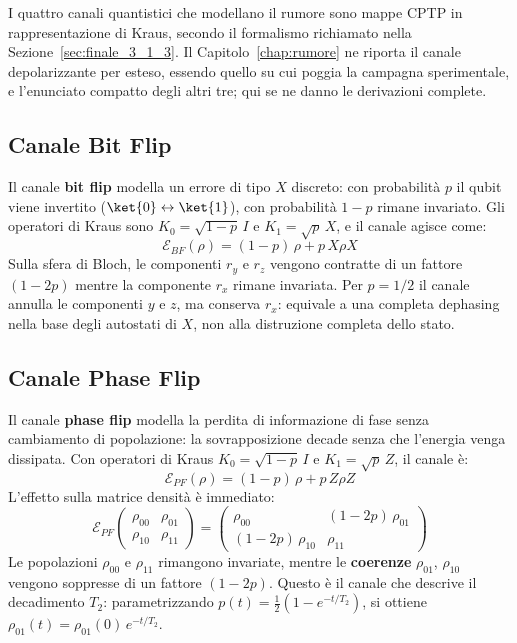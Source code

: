 
I quattro canali quantistici che modellano il rumore sono mappe \ac{CPTP} in
rappresentazione di Kraus, secondo il formalismo richiamato nella
Sezione~\ref{sec:finale_3_1_3}. Il Capitolo~\ref{chap:rumore} ne riporta il
canale depolarizzante per esteso, essendo quello su cui poggia la campagna
sperimentale, e l'enunciato compatto degli altri tre; qui se ne danno le
derivazioni complete.

\subsection{Canale Bit Flip}

Il canale \textbf{bit flip} modella un errore di tipo $X$ discreto: con probabilità $p$ il qubit viene invertito ($\ket{0}\leftrightarrow\ket{1}$), con probabilità $1-p$ rimane invariato. Gli operatori di Kraus sono $K_0 = \sqrt{1-p}\,I$ e $K_1 = \sqrt{p}\,X$, e il canale agisce come:
\begin{equation}
    \mathcal{E}_{BF}(\rho) = (1-p)\,\rho + p\,X\rho X
    \label{eq:bitflip}
\end{equation}
Sulla sfera di Bloch, le componenti $r_y$ e $r_z$ vengono contratte di un fattore $(1-2p)$ mentre la componente $r_x$ rimane invariata. Per $p=1/2$ il canale annulla le componenti $y$ e $z$, ma conserva $r_x$: equivale a una completa dephasing nella base degli autostati di $X$, non alla distruzione completa dello stato.

\subsection{Canale Phase Flip}

Il canale \textbf{phase flip} modella la perdita di informazione di fase senza cambiamento di popolazione: la sovrapposizione decade senza che l'energia venga dissipata. Con operatori di Kraus $K_0 = \sqrt{1-p}\,I$ e $K_1 = \sqrt{p}\,Z$, il canale è:
\begin{equation}
    \mathcal{E}_{PF}(\rho) = (1-p)\,\rho + p\,Z\rho Z
    \label{eq:phaseflip}
\end{equation}
L'effetto sulla matrice densità è immediato:
\begin{equation}
    \mathcal{E}_{PF}\!\begin{pmatrix}\rho_{00} & \rho_{01} \\ \rho_{10} & \rho_{11}\end{pmatrix}
    = \begin{pmatrix}\rho_{00} & (1-2p)\,\rho_{01} \\ (1-2p)\,\rho_{10} & \rho_{11}\end{pmatrix}
\end{equation}
Le popolazioni $\rho_{00}$ e $\rho_{11}$ rimangono invariate, mentre le \textbf{coerenze} $\rho_{01}$, $\rho_{10}$ vengono soppresse di un fattore $(1-2p)$. Questo è il canale che descrive il decadimento $T_2$: parametrizzando $p(t) = \frac{1}{2}(1-e^{-t/T_2})$, si ottiene $\rho_{01}(t) = \rho_{01}(0)\,e^{-t/T_2}$.

